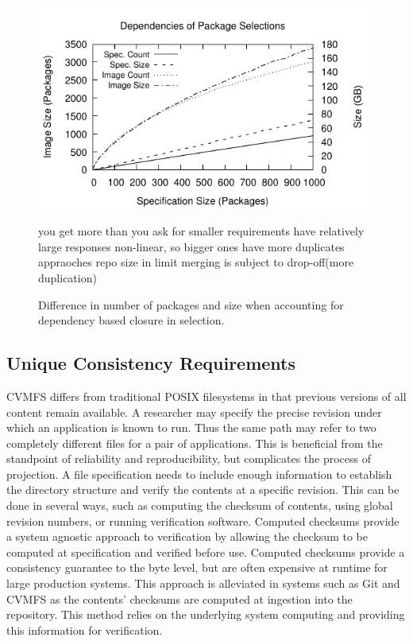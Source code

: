 \documentclass[sigconf]{acmart}
\begin{document}
\begin{figure}
\includegraphics[width=\linewidth]{curated/closure/closure.pdf}
\caption{Difference in number of packages and size when accounting for dependency based closure in selection.}
\label{fig:picks}
you get more than you ask for
smaller requirements have relatively large responses
non-linear, so bigger ones have more duplicates
appraoches repo size in limit
merging is subject to drop-off(more duplication)
\fi
\end{figure}



\subsection{Unique Consistency Requirements}
CVMFS differs from traditional POSIX filesystems in that previous versions of all content remain available.
A researcher may specify the precise revision under which an application is known to run.
Thus the same path may refer to two completely different files for a pair of applications.
This is beneficial from the standpoint of reliability and reproducibility,
but complicates the process of projection.
A file specification needs to include enough information
to establish the directory structure and verify the contents at a specific revision.
This can be done in several ways, 
such as computing the checksum of contents,
using global revision numbers, 
or running verification software.
Computed checksums provide a system agnostic approach
to verification by allowing the checksum to be computed
at specification and verified before use.
Computed checksums provide a
consistency guarantee to the byte level,
but are often expensive at runtime for large
production systems.
This approach is alleviated in systems such as 
Git and CVMFS as the contents' checksums are 
computed at ingestion into the repository.
This method relies on the underlying system computing
and providing this information for verification.
\end{document}
